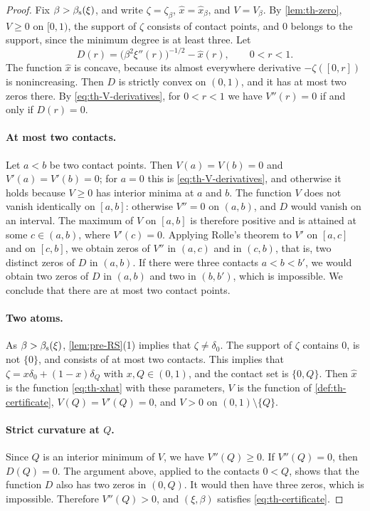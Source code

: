 \begin{proof}
Fix $\beta>\beta_{\mathrm s}(\xi)$, and write $\zeta=\zeta_\beta$, $\hat x=\hat x_\beta$, and $V=V_\beta$. By \cref{lem:th-zero}, $V\ge0$ on $[0,1)$, the support of $\zeta$ consists of contact points, and $0$ belongs to the support, since the minimum degree is at least three. Let
\[
D(r)=\big(\beta^2\xi''(r)\big)^{-1/2}-\hat x(r),\qquad 0<r<1.
\]
The function $\hat x$ is concave, because its almost everywhere derivative $-\zeta([0,r])$ is nonincreasing. Then $D$ is strictly convex on $(0,1)$, and it has at most two zeros there. By \eqref{eq:th-V-derivatives}, for $0<r<1$ we have $V''(r)=0$ if and only if $D(r)=0$.

\paragraph{At most two contacts.}
Let $a<b$ be two contact points. Then $V(a)=V(b)=0$ and $V'(a)=V'(b)=0$; for $a=0$ this is \eqref{eq:th-V-derivatives}, and otherwise it holds because $V\ge0$ has interior minima at $a$ and $b$. The function $V$ does not vanish identically on $[a,b]$: otherwise $V''=0$ on $(a,b)$, and $D$ would vanish on an interval. The maximum of $V$ on $[a,b]$ is therefore positive and is attained at some $c\in(a,b)$, where $V'(c)=0$. Applying Rolle's theorem to $V'$ on $[a,c]$ and on $[c,b]$, we obtain zeros of $V''$ in $(a,c)$ and in $(c,b)$, that is, two distinct zeros of $D$ in $(a,b)$. If there were three contacts $a<b<b'$, we would obtain two zeros of $D$ in $(a,b)$ and two in $(b,b')$, which is impossible. We conclude that there are at most two contact points.

\paragraph{Two atoms.}
As $\beta>\beta_{\mathrm s}(\xi)$, \cref{lem:pre-RS}(1) implies that $\zeta\ne\delta_0$. The support of $\zeta$ contains $0$, is not $\{0\}$, and consists of at most two contacts. This implies that $\zeta=x\delta_0+(1-x)\delta_Q$ with $x,Q\in(0,1)$, and the contact set is $\{0,Q\}$. Then $\hat x$ is the function \eqref{eq:th-xhat} with these parameters, $V$ is the function of \cref{def:th-certificate}, $V(Q)=V'(Q)=0$, and $V>0$ on $(0,1)\setminus\{Q\}$.

\paragraph{Strict curvature at $Q$.}
Since $Q$ is an interior minimum of $V$, we have $V''(Q)\ge0$. If $V''(Q)=0$, then $D(Q)=0$. The argument above, applied to the contacts $0<Q$, shows that the function $D$ also has two zeros in $(0,Q)$. It would then have three zeros, which is impossible. Therefore $V''(Q)>0$, and $(\xi,\beta)$ satisfies \eqref{eq:th-certificate}.
\end{proof}

